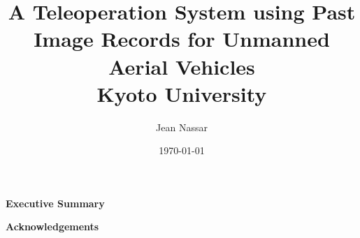 \title{
  {A Teleoperation System using Past Image Records for Unmanned Aerial Vehicles}\\
  {\large Kyoto University}
}
\author{Jean Nassar}
\date{\today}

\maketitle

\thispagestyle{empty}
  \null{}
    \begin{flushright}
    \end{flushright}
  \null

\newcommand\summaryname{Executive Summary}
\newenvironment{summary}%
  {\cleardoublepage\thispagestyle{empty}%
    \null\vfill%
    \begin{center}%
      \bfseries \summaryname
    \end{center}}%
  \vfill\null
  \begin{summary}
    \lipsum[1-3]
  \end{summary}

\newcommand\ackname{Acknowledgements}
\newenvironment{acknowledgements}%
  {\cleardoublepage\thispagestyle{empty}%
    \null\vfill%
    \begin{center}%
      \bfseries \ackname
    \end{center}}%
  \vfill\null
  \begin{acknowledgements}
    \lipsum[4-5]
  \end{acknowledgements}

\tableofcontents
\listoffigures
\listoftables

